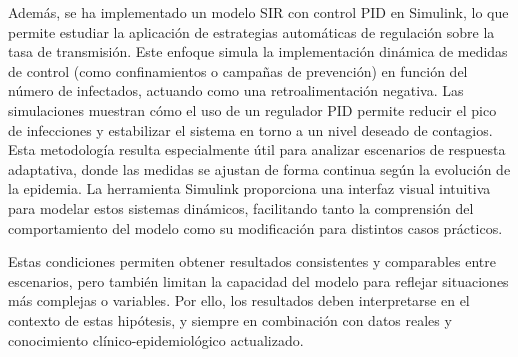 Además, se ha implementado un modelo SIR con control PID en Simulink, lo que permite estudiar la aplicación de estrategias automáticas de regulación sobre la tasa de transmisión. Este enfoque simula la implementación dinámica de medidas de control (como confinamientos o campañas de prevención) en función del número de infectados, actuando como una retroalimentación negativa. Las simulaciones muestran cómo el uso de un regulador PID permite reducir el pico de infecciones y estabilizar el sistema en torno a un nivel deseado de contagios. Esta metodología resulta especialmente útil para analizar escenarios de respuesta adaptativa, donde las medidas se ajustan de forma continua según la evolución de la epidemia. La herramienta Simulink proporciona una interfaz visual intuitiva para modelar estos sistemas dinámicos, facilitando tanto la comprensión del comportamiento del modelo como su modificación para distintos casos prácticos.

Estas condiciones permiten obtener resultados consistentes y comparables entre escenarios, pero también limitan la capacidad del modelo para reflejar situaciones más complejas o variables. Por ello, los resultados deben interpretarse en el contexto de estas hipótesis, y siempre en combinación con datos reales y conocimiento clínico-epidemiológico actualizado.


